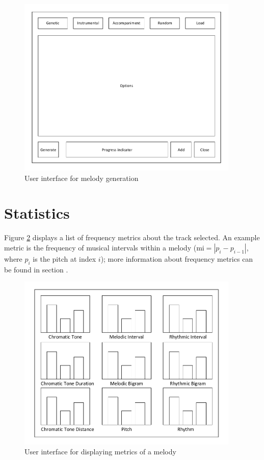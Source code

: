 \begin{figure}
\centerline{\includegraphics[width=400px]{../images/ui_track.pdf}}
\caption{User interface for melody generation}
\label{ims:uitrack}
\end{figure}



\section{Statistics}

Figure \ref{ims:uimetrics} displays a list of frequency metrics about the track selected. An example metric is the frequency of musical intervals within a melody ($\text{mi} = |p_i - p_{i-1}|$, where $p_i$ is the pitch at index $i$); more information about frequency metrics can be found in section \label{chap:metrics}.

\begin{figure}
\centerline{\includegraphics[width=400px]{../images/ui_metrics.pdf}}
\caption{User interface for displaying metrics of a melody}
\label{ims:uimetrics}
\end{figure}


